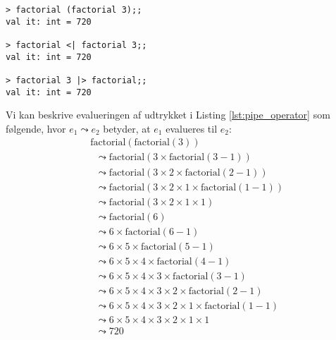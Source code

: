 \begin{lstlisting}[style=output, label={lst:pipe_operator}, caption={Eksempel på anvendelse af pipe-operatorer i F\# ved udregning af $(3!)! = 6! = 720 $.}]
> factorial (factorial 3);;
val it: int = 720

> factorial <| factorial 3;;
val it: int = 720

> factorial 3 |> factorial;;
val it: int = 720
\end{lstlisting}

Vi kan beskrive evalueringen af udtrykket i Listing \ref{lst:pipe_operator} som følgende, hvor $e_1 \leadsto e_2$ betyder, at $e_1$ evalueres til $e_2$:
\[
\begin{aligned}
&\text{factorial}(\text{factorial}(3)) \\
&\;\;\leadsto \text{factorial}(3 \times \text{factorial}(3 - 1)) \\
&\;\;\leadsto \text{factorial}(3 \times 2 \times \text{factorial}(2 - 1)) \\
&\;\;\leadsto \text{factorial}(3 \times 2 \times 1 \times \text{factorial}(1 - 1)) \\
&\;\;\leadsto \text{factorial}(3 \times 2 \times 1 \times 1) \\
&\;\;\leadsto \text{factorial}(6) \\
&\;\;\leadsto 6 \times \text{factorial}(6 - 1) \\
&\;\;\leadsto 6 \times 5 \times \text{factorial}(5 - 1) \\
&\;\;\leadsto 6 \times 5 \times 4 \times \text{factorial}(4 - 1) \\
&\;\;\leadsto 6 \times 5 \times 4 \times 3 \times \text{factorial}(3 - 1) \\
&\;\;\leadsto 6 \times 5 \times 4 \times 3 \times 2 \times \text{factorial}(2 - 1) \\
&\;\;\leadsto 6 \times 5 \times 4 \times 3 \times 2 \times 1 \times \text{factorial}(1 - 1) \\
&\;\;\leadsto 6 \times 5 \times 4 \times 3 \times 2 \times 1 \times 1 \\
&\;\;\leadsto 720
\end{aligned}
\]


